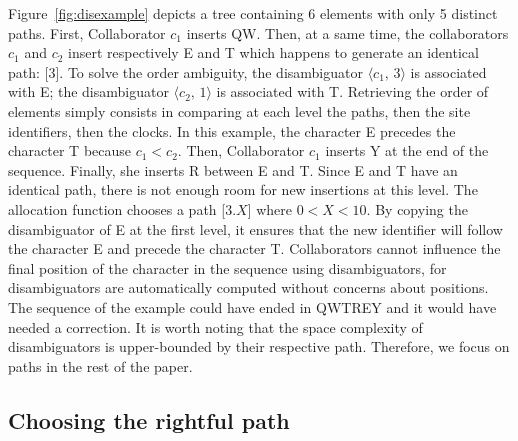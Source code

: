 Figure~\ref{fig:disexample} depicts a tree containing 6 elements with only 5
distinct paths. First, Collaborator $c_1$ inserts QW.  Then, at a same time, the
collaborators $c_1$ and $c_2$ insert respectively E and T which happens to
generate an identical path: [$3$]. To solve the order ambiguity, the
disambiguator $\langle c_1,\, 3\rangle$ is associated with E; the disambiguator
$\langle c_2,\, 1\rangle$ is associated with T. Retrieving the order of elements
simply consists in comparing at each level the paths, then the site identifiers,
then the clocks. In this example, the character E precedes the character T
because $c_1 < c_2$. Then, Collaborator $c_1$ inserts Y at the end of the
sequence. Finally, she inserts R between E and T. Since E and T have an
identical path, there is not enough room for new insertions at this level. The
allocation function chooses a path [$3.X$] where $0<X<10$. By copying the
disambiguator of E at the first level, it ensures that the new identifier will
follow the character E and precede the character T.  Collaborators cannot
influence the final position of the character in the sequence using
disambiguators, for disambiguators are automatically computed without concerns
about positions. The sequence of the example could have ended in QWTREY and it
would have needed a correction. It is worth noting that the space complexity of
disambiguators is upper-bounded by their respective path. Therefore, we focus on
paths in the rest of the paper.




\subsection{Choosing the rightful path}
\label{subsec:choosing}

